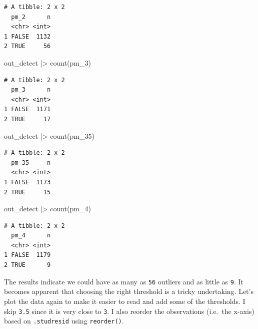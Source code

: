 \documentclass[
  letterpaper,
]{krantz}
\makeatletter
\newenvironment{Shaded}{\begin{snugshade}}{\end{snugshade}}
\newcommand{\FunctionTok}[1]{\textcolor[rgb]{0.28,0.35,0.67}{#1}}
\newcommand{\NormalTok}[1]{\textcolor[rgb]{0.00,0.23,0.31}{#1}}
\newcommand{\SpecialCharTok}[1]{\textcolor[rgb]{0.37,0.37,0.37}{#1}}
\newenvironment{kframe}{%
\medskip{}
\setlength{\fboxsep}{.8em}
 \def\at@end@of@kframe{}%
 \ifinner\ifhmode%
  \def\at@end@of@kframe{\end{minipage}}%
  \begin{minipage}{\columnwidth}%
 \fi\fi%
 \def\FrameCommand##1{\hskip\@totalleftmargin \hskip-\fboxsep
 \colorbox{shadecolor}{##1}\hskip-\fboxsep
     \hskip-\linewidth \hskip-\@totalleftmargin \hskip\columnwidth}%
 \MakeFramed {\advance\hsize-\width
   \@totalleftmargin\z@ \linewidth\hsize
   \@setminipage}}%
 {\par\unskip\endMakeFramed%
 \at@end@of@kframe}
\renewenvironment{Shaded}{\begin{kframe}}{\end{kframe}}
\makeatother
\begin{document}
\begin{verbatim}
# A tibble: 2 x 2
  pm_2      n
  <chr> <int>
1 FALSE  1132
2 TRUE     56
\end{verbatim}

\begin{Shaded}
\begin{Highlighting}[]
\NormalTok{out\_detect }\SpecialCharTok{|\textgreater{}} \FunctionTok{count}\NormalTok{(pm\_3)}
\end{Highlighting}
\end{Shaded}

\begin{verbatim}
# A tibble: 2 x 2
  pm_3      n
  <chr> <int>
1 FALSE  1171
2 TRUE     17
\end{verbatim}

\begin{Shaded}
\begin{Highlighting}[]
\NormalTok{out\_detect }\SpecialCharTok{|\textgreater{}} \FunctionTok{count}\NormalTok{(pm\_35)}
\end{Highlighting}
\end{Shaded}

\begin{verbatim}
# A tibble: 2 x 2
  pm_35     n
  <chr> <int>
1 FALSE  1173
2 TRUE     15
\end{verbatim}

\begin{Shaded}
\begin{Highlighting}[]
\NormalTok{out\_detect }\SpecialCharTok{|\textgreater{}} \FunctionTok{count}\NormalTok{(pm\_4)}
\end{Highlighting}
\end{Shaded}

\begin{verbatim}
# A tibble: 2 x 2
  pm_4      n
  <chr> <int>
1 FALSE  1179
2 TRUE      9
\end{verbatim}

The results indicate we could have as many as \texttt{56} outliers and
as little as \texttt{9}. It becomes apparent that choosing the right
threshold is a tricky undertaking. Let's plot the data again to make it
easier to read and add some of the thresholds. I skip \texttt{3.5} since
it is very close to \texttt{3}. I also reorder the observations
(i.e.~the x-axis) based on \texttt{.studresid} using \texttt{reorder()}.
\end{document}
